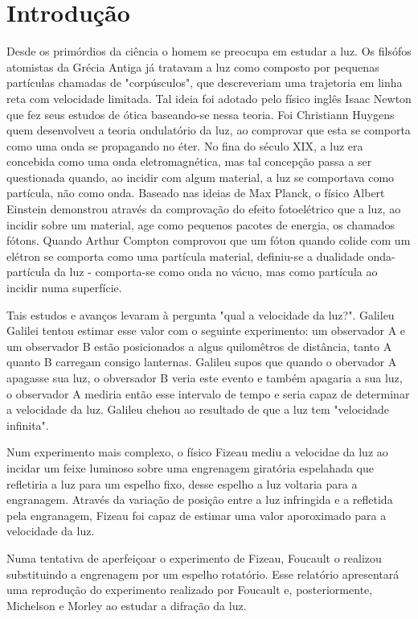 \section{Introdução}
Desde os primórdios da ciência o homem se preocupa em estudar a luz. Os
filsófos atomistas da Grécia Antiga já tratavam a luz como composto
por pequenas partículas chamadas de "corpúsculos", que descreveriam
uma trajetoria em linha reta com velocidade limitada. Tal ideia foi
adotado pelo físico inglês Isaac Newton que fez seus estudos de ótica
baseando-se nessa teoria. Foi Christiann Huygens quem desenvolveu a
teoria ondulatório da luz, ao comprovar que esta se comporta como uma
onda se propagando no éter. No fina do século XIX, a luz era concebida
como uma onda eletromagnética, mas tal concepção passa a ser
questionada quando, ao incidir com algum material, a luz se comportava
como partícula, não como onda. Baseado nas ideias de Max Planck, o
físico Albert Einstein demonstrou através da comprovação do efeito
fotoelétrico que a luz, ao incidir sobre um material, age como
pequenos pacotes de energia, os chamados fótons. Quando Arthur Compton
comprovou que um fóton quando colide com um elétron se comporta como
uma partícula material, definiu-se a dualidade onda-partícula da luz -
comporta-se como onda no vácuo, mas como partícula ao incidir numa
superfície.

Tais estudos e avanços levaram à pergunta "qual a velocidade da luz?".
Galileu Galilei tentou estimar esse valor com o seguinte experimento:
um observador A e um observador B estão posicionados a algus
quilomêtros de distância, tanto A quanto B carregam consigo lanternas.
Galileu supos que quando o obervador A apagasse sua luz, o obversador
B veria este evento e também apagaria a sua luz, o observador A
mediria então esse intervalo de tempo e seria capaz de determinar a
velocidade da luz. Galileu chehou ao resultado de que a luz tem
"velocidade infinita".

Num experimento mais complexo, o físico Fizeau mediu a velocidae da
luz ao incidar um feixe luminoso sobre uma engrenagem giratória
espelahada que refletiria a luz para um espelho fixo, desse espelho a
luz voltaria para a engranagem. Através da variação de posição entre a
luz infringida e a refletida pela engranagem, Fizeau foi capaz de
estimar uma valor aporoximado para a velocidade da luz.

Numa tentativa de aperfeiçoar o experimento de Fizeau, Foucault o
realizou substituindo a engrenagem por um espelho rotatório. Esse
relatório apresentará uma reprodução do experimento realizado por
Foucault e, posteriormente, Michelson e Morley ao estudar a difração
da luz.
